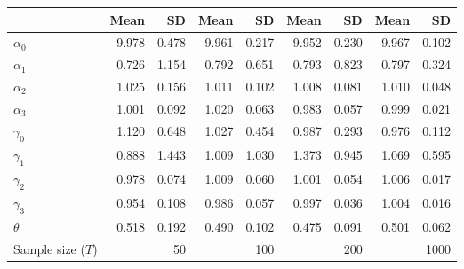 
\begin{tabular}[t]{lrrrrrrrr}
\toprule
  & Mean & SD & Mean  & SD  & Mean   & SD   & Mean    & SD   \\
\midrule
$\alpha_{0}$ & 9.978 & 0.478 & 9.961 & 0.217 & 9.952 & 0.230 & 9.967 & 0.102\\
$\alpha_{1}$ & 0.726 & 1.154 & 0.792 & 0.651 & 0.793 & 0.823 & 0.797 & 0.324\\
$\alpha_{2}$ & 1.025 & 0.156 & 1.011 & 0.102 & 1.008 & 0.081 & 1.010 & 0.048\\
$\alpha_{3}$ & 1.001 & 0.092 & 1.020 & 0.063 & 0.983 & 0.057 & 0.999 & 0.021\\
$\gamma_{0}$ & 1.120 & 0.648 & 1.027 & 0.454 & 0.987 & 0.293 & 0.976 & 0.112\\
$\gamma_{1}$ & 0.888 & 1.443 & 1.009 & 1.030 & 1.373 & 0.945 & 1.069 & 0.595\\
$\gamma_{2}$ & 0.978 & 0.074 & 1.009 & 0.060 & 1.001 & 0.054 & 1.006 & 0.017\\
$\gamma_{3}$ & 0.954 & 0.108 & 0.986 & 0.057 & 0.997 & 0.036 & 1.004 & 0.016\\
$\theta$ & 0.518 & 0.192 & 0.490 & 0.102 & 0.475 & 0.091 & 0.501 & 0.062\\
Sample size ($T$) &  & 50 &  & 100 &  & 200 &  & 1000\\
\bottomrule
\end{tabular}
